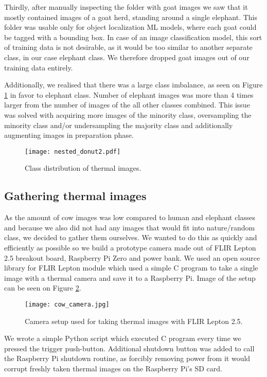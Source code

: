 Thirdly, after manually inspecting the folder with goat images we saw that it mostly contained images of a goat herd, standing around a single elephant.
This folder was usable only for object localization ML models, where each goat could be tagged with a bounding box. 
In case of an image classification model, this sort of training data is not desirable, as it would be too similar to another separate class, in our case elephant class.
We therefore dropped goat images out of our training data entirely.

Additionally, we realised that there was a large class imbalance, as seen on Figure \ref{nested_donut2} in favor to elephant class.
Number of elephant images was more than 4 times larger from the number of images of the all other classes combined.
This issue was solved with acquiring more images of the minority class, oversampling the minority class and/or undersampling the majority class and additionally augmenting images in preparation phase.

\begin{figure}[ht]
    \centering
    \texttt{[image: nested\_donut2.pdf]} 
    \caption{Class distribution of thermal images.}
    \label{nested_donut2}
\end{figure}

\subsection{ Gathering thermal images}

As the amount of cow images was low compared to human and elephant classes and because we also did not had any images that would fit into nature/random class, we decided to gather them ourselves.
We wanted to do this as quickly and efficiently as possible so we build a prototype camera made out of FLIR Lepton 2.5 breakout board, Raspberry Pi Zero and power bank.
We used an open source library \cite{flir_github} for FLIR Lepton module which used a simple C program to take a single image with a thermal camera and save it to a Raspberry Pi.
Image of the setup can be seen on Figure \ref{cow_camera}.

\begin{figure}[ht]
    \centering
    \texttt{[image: cow\_camera.jpg]} 
    \caption{Camera setup used for taking thermal images with FLIR Lepton 2.5.}
    \label{cow_camera}
\end{figure}

We wrote a simple Python script which executed C program every time we pressed the trigger push-button.
Additional shutdown button was added to call the Raspberry Pi shutdown routine, as forcibly removing power from it would corrupt freshly taken thermal images on the Raspberry Pi's SD card.

